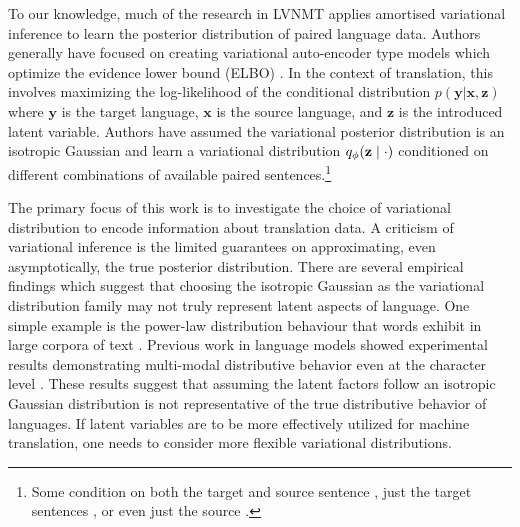To our knowledge, much of the research in \ac{LVNMT} applies amortised variational inference to learn the posterior distribution of paired language data. Authors generally have focused on creating variational auto-encoder type models which optimize the evidence lower bound (ELBO) \cite{ kingma2014autoencodingVB, rezende2014stochasticBackprop}. In the context of translation, this involves maximizing the log-likelihood of the conditional distribution $p(\textbf{y} | \textbf{x}, \textbf{z})$ where $\textbf{y}$ is the target language, $\textbf{x}$ is the source language, and $\textbf{z}$ is the introduced latent variable. Authors have assumed the variational posterior distribution is an isotropic Gaussian and learn a variational distribution $q_{\phi}(\textbf{z}\; | \;{\cdot})$ conditioned on different combinations of available paired sentences.\footnote{ Some condition on both the target and source sentence \cite{Zhang2016VNMT,eikema2018AEVNMT,harshil2018GNMT},  just the target sentences \cite{schulz2018StochasticDecoder}, or even just the source \cite{eikema2018AEVNMT}.} 


The primary focus of this work is to investigate the choice of variational distribution to encode information about translation data. A criticism of variational inference is the limited guarantees on approximating, even asymptotically, the true posterior distribution. There are several empirical findings which suggest that choosing the isotropic Gaussian as the variational distribution family may not truly represent latent aspects of language. One simple example is the power-law distribution behaviour that words exhibit in large corpora of text \cite{koehnSMT2010}. Previous work in language models showed experimental results demonstrating multi-modal distributive behavior even at the character level \cite{ziegler2019LatentNFforDiscrete}. These results suggest that assuming the latent factors follow an isotropic Gaussian distribution is not representative of the true distributive behavior of languages. If latent variables are to be more effectively utilized for machine translation, one needs to consider more flexible variational distributions. 

